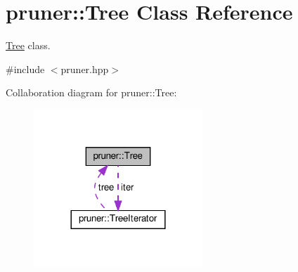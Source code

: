 \hypertarget{classpruner_1_1Tree}{}\section{pruner\+:\+:Tree Class Reference}
\label{classpruner_1_1Tree}


\hyperlink{classpruner_1_1Tree}{Tree} class.  




{\ttfamily \#include $<$pruner.\+hpp$>$}



Collaboration diagram for pruner\+:\+:Tree\+:
\nopagebreak
\begin{figure}[H]
\begin{center}
\leavevmode
\includegraphics[width=180pt]{classpruner_1_1Tree__coll__graph}
\end{center}
\end{figure}
